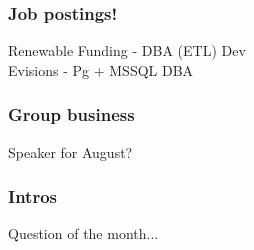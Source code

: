 \documentclass{beamer}
\begin{document}
\frame
{
  \frametitle{Job postings!}
  \begin{center}
Renewable Funding - DBA (ETL) Dev\\
\vspace{5 mm}
Evisions - Pg + MSSQL DBA\\
\vspace{5 mm}
  \end{center}
}

\frame
{
  \frametitle{Group business}
  \begin{center}
Speaker for August?\\
  \end{center}
}

\frame
{
  \frametitle{Intros}
  \begin{center}
Question of the month...\\
  \end{center}
}
\end{document}
